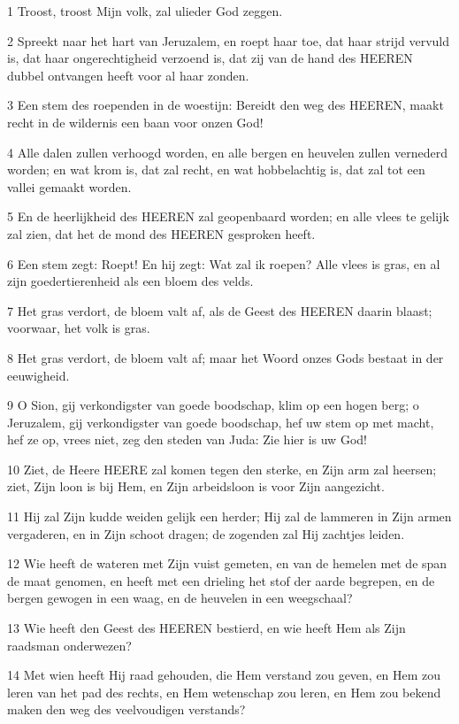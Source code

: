 \par 1 Troost, troost Mijn volk, zal ulieder God zeggen.
\par 2 Spreekt naar het hart van Jeruzalem, en roept haar toe, dat haar strijd vervuld is, dat haar ongerechtigheid verzoend is, dat zij van de hand des HEEREN dubbel ontvangen heeft voor al haar zonden.
\par 3 Een stem des roependen in de woestijn: Bereidt den weg des HEEREN, maakt recht in de wildernis een baan voor onzen God!
\par 4 Alle dalen zullen verhoogd worden, en alle bergen en heuvelen zullen vernederd worden; en wat krom is, dat zal recht, en wat hobbelachtig is, dat zal tot een vallei gemaakt worden.
\par 5 En de heerlijkheid des HEEREN zal geopenbaard worden; en alle vlees te gelijk zal zien, dat het de mond des HEEREN gesproken heeft.
\par 6 Een stem zegt: Roept! En hij zegt: Wat zal ik roepen? Alle vlees is gras, en al zijn goedertierenheid als een bloem des velds.
\par 7 Het gras verdort, de bloem valt af, als de Geest des HEEREN daarin blaast; voorwaar, het volk is gras.
\par 8 Het gras verdort, de bloem valt af; maar het Woord onzes Gods bestaat in der eeuwigheid.
\par 9 O Sion, gij verkondigster van goede boodschap, klim op een hogen berg; o Jeruzalem, gij verkondigster van goede boodschap, hef uw stem op met macht, hef ze op, vrees niet, zeg den steden van Juda: Zie hier is uw God!
\par 10 Ziet, de Heere HEERE zal komen tegen den sterke, en Zijn arm zal heersen; ziet, Zijn loon is bij Hem, en Zijn arbeidsloon is voor Zijn aangezicht.
\par 11 Hij zal Zijn kudde weiden gelijk een herder; Hij zal de lammeren in Zijn armen vergaderen, en in Zijn schoot dragen; de zogenden zal Hij zachtjes leiden.
\par 12 Wie heeft de wateren met Zijn vuist gemeten, en van de hemelen met de span de maat genomen, en heeft met een drieling het stof der aarde begrepen, en de bergen gewogen in een waag, en de heuvelen in een weegschaal?
\par 13 Wie heeft den Geest des HEEREN bestierd, en wie heeft Hem als Zijn raadsman onderwezen?
\par 14 Met wien heeft Hij raad gehouden, die Hem verstand zou geven, en Hem zou leren van het pad des rechts, en Hem wetenschap zou leren, en Hem zou bekend maken den weg des veelvoudigen verstands?
